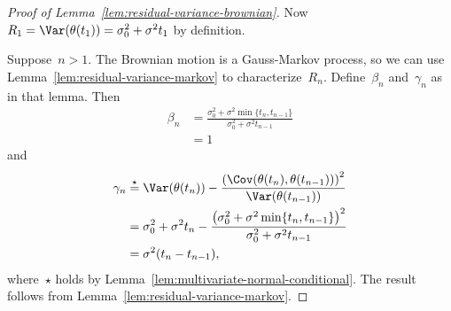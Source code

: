 \begin{proof}[Proof of Lemma~\ref{lem:residual-variance-brownian}]
    Now~$R_1=\Var(\theta(t_1))=\sigma_0^2+\sigma^2t_1$ by definition.
    
    Suppose~$n>1$.
    The Brownian motion is a Gauss-Markov process, so we can use Lemma~\ref{lem:residual-variance-markov} to characterize~$R_n$.
    Define~$\beta_n$ and~$\gamma_n$ as in that lemma.
    Then
    \begin{align*}
        \beta_n
        &= \frac{\sigma_0^2+\sigma^2\min\{t_n,t_{n-1}\}}{\sigma_0^2+\sigma^2t_{n-1}} \\
        &= 1
    \end{align*}
    and
    \begin{align*}
        \gamma_n
        &\overset{\star}{=} \Var(\theta(t_n))-\frac{\left(\Cov(\theta(t_n),\theta(t_{n-1}))\right)^2}{\Var(\theta(t_{n-1}))} \\
        &= \sigma_0^2+\sigma^2t_n-\frac{\left(\sigma_0^2+\sigma^2\min\{t_n,t_{n-1}\}\right)^2}{\sigma_0^2+\sigma^2t_{n-1}} \\
        &= \sigma^2(t_n-t_{n-1}),
    \end{align*}
    where~$\star$ holds by Lemma~\ref{lem:multivariate-normal-conditional}.
    The result follows from Lemma~\ref{lem:residual-variance-markov}.
\end{proof}
